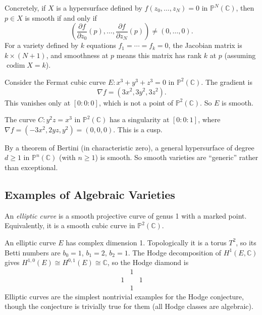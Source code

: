 Concretely, if $X$ is a hypersurface defined by $f(z_0, \ldots, z_N) = 0$ in $\mathbb{P}^N(\mathbb{C})$, then $p \in X$ is smooth if and only if
\[
\left(\frac{\partial f}{\partial z_0}(p), \ldots, \frac{\partial f}{\partial z_N}(p)\right) \neq (0, \ldots, 0).
\]
For a variety defined by $k$ equations $f_1 = \cdots = f_k = 0$, the Jacobian matrix is $k \times (N+1)$, and smoothness at $p$ means this matrix has rank $k$ at $p$ (assuming $\operatorname{codim} X = k$).

\begin{example}
Consider the Fermat cubic curve $E: x^3 + y^3 + z^3 = 0$ in $\mathbb{P}^2(\mathbb{C})$. The gradient is
\[
\nabla f = (3x^2, 3y^2, 3z^2).
\]
This vanishes only at $[0 : 0 : 0]$, which is not a point of $\mathbb{P}^2(\mathbb{C})$. So $E$ is smooth.
\end{example}

\begin{example}
The curve $C: y^2 z = x^3$ in $\mathbb{P}^2(\mathbb{C})$ has a singularity at $[0 : 0 : 1]$, where $\nabla f = (-3x^2, 2yz, y^2) = (0, 0, 0)$. This is a cusp.
\end{example}

By a theorem of Bertini (in characteristic zero), a general hypersurface of degree $d \ge 1$ in $\mathbb{P}^n(\mathbb{C})$ (with $n \ge 1$) is smooth. So smooth varieties are ``generic'' rather than exceptional.

\subsection{Examples of Algebraic Varieties}

\begin{definition}
An \emph{elliptic curve} is a smooth projective curve of genus 1 with a marked point. Equivalently, it is a smooth cubic curve in $\mathbb{P}^2(\mathbb{C})$.
\end{definition}

An elliptic curve $E$ has complex dimension 1. Topologically it is a torus $T^2$, so its Betti numbers are $b_0 = 1$, $b_1 = 2$, $b_2 = 1$. The Hodge decomposition of $H^1(E, \mathbb{C})$ gives $H^{1,0}(E) \cong H^{0,1}(E) \cong \mathbb{C}$, so the Hodge diamond is
\[
\begin{array}{ccc}
 & 1 & \\
1 & & 1 \\
 & 1 &
\end{array}
\]
Elliptic curves are the simplest nontrivial examples for the Hodge conjecture, though the conjecture is trivially true for them (all Hodge classes are algebraic).

